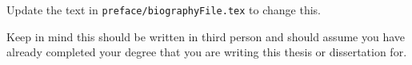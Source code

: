 Update the text in \verb|preface/biographyFile.tex| to change this.

Keep in mind this should be written in third person and should assume you have already completed your degree that you are writing this thesis or dissertation for. 